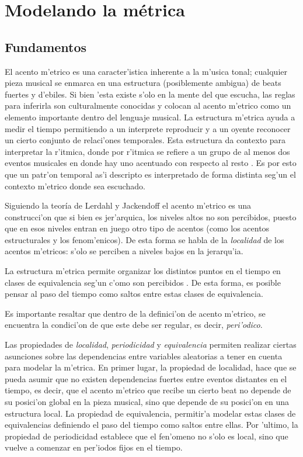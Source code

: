 \section{Modelando la m\'etrica}
\label{sec:metric_model}
\subsection{Fundamentos}
El acento m'etrico es una caracter'istica inherente a la m'usica tonal; cualquier pieza musical se enmarca en una estructura 
(posiblemente ambigua) de beats fuertes y d'ebiles. Si bien 'esta existe s'olo en la mente del que escucha, las reglas para inferirla son culturalmente conocidas 
y colocan al acento m'etrico como un elemento importante dentro del lenguaje musical. La estructura m'etrica ayuda a medir el tiempo permitiendo a un interprete 
reproducir y a un oyente reconocer un cierto conjunto de relaci'ones temporales. Esta estructura da contexto para interpretar la r'itmica,  
donde por r'itmica se refiere a un grupo de al menos dos eventos musicales en donde hay uno acentuado con respecto al resto \citep{CooperMeyer60}.
Es por esto que un patr'on temporal as'i descripto es interpretado de forma distinta seg'un el contexto m'etrico donde sea escuchado. 

Siguiendo la teor\'ia de Lerdahl y Jackendoff el acento m'etrico es una construcci'on que si bien es jer'arquica, los niveles altos no son percibidos, puesto
que en esos niveles entran en juego otro tipo de acentos (como los acentos estructurales y los fenom'enicos). De esta forma se habla de la \emph{localidad} de los acentos m'etricos: 
s'olo se perciben a niveles bajos en la jerarqu'ia. 

La estructura m'etrica permite organizar los distintos puntos en el tiempo en clases de equivalencia seg'un c'omo son percibidos \citep{Benjamin84}.
De esta forma, es posible pensar al paso del tiempo como saltos entre estas clases de equivalencia.

Es importante resaltar que dentro de la definici'on de acento m'etrico, se encuentra la condici'on de que este debe ser regular, es decir, \emph{peri'odico}. 

Las propiedades de \emph{localidad}, \emph{periodicidad} y \emph{equivalencia} permiten realizar ciertas asunciones sobre las dependencias entre variables aleatorias 
a tener en cuenta para modelar la m'etrica. En primer lugar, la propiedad de localidad, hace que se pueda asumir que no existen dependencias fuertes 
entre eventos distantes en el tiempo, es decir, que el acento m'etrico que recibe un cierto beat no depende de su posici'on global en la pieza musical, 
sino que depende de su posici'on en una estructura local.   
La propiedad de equivalencia, permitir'a modelar estas clases de equivalencias definiendo el paso del tiempo como saltos entre ellas. 
Por 'ultimo, la propiedad de periodicidad establece que el fen'omeno no s'olo es local, 
sino que vuelve a comenzar en per'iodos fijos en el tiempo.


